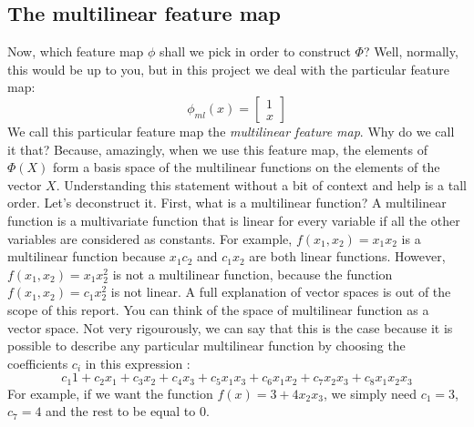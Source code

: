 \documentclass{article}
\theoremstyle{definition}
\theoremstyle{definition}
\begin{document}
\subsection{The multilinear feature map}
Now, which feature map $\phi$ shall we pick in order to construct $\Phi$?
Well, normally, this would be up to you, but in this project we deal with the particular feature map:
\begin{equation}
    \phi_{ml}(x) = 
    \begin{bmatrix}
        1 \\
        x
    \end{bmatrix}
\end{equation}
We call this particular feature map the \emph{multilinear feature map}.
Why do we call it that? Because, amazingly, when we use this feature map, the elements of $\Phi(X)$ form a basis space of the multilinear functions on the elements of the vector $X$.
Understanding this statement without a bit of context and help is a tall order. Let's deconstruct it.
First, what is a multilinear function? A multilinear function is a multivariate function that is linear for every variable if all the other variables are considered as constants. For example, $f(x_1, x_2) = x_1 x_2$ is a multilinear function because $x_1 c_2$ and $c_1 x_2$ are both linear functions. However, $f(x_1, x_2) = x_1 x_2^2$ is not a multilinear function, because the function $f(x_1, x_2) = c_1 x_2^2$ is not linear. A full explanation of vector spaces is out of the scope of this report. You can think of the space of multilinear function as a vector space. Not very rigourously, we can say that this is the case because it is possible to describe any particular multilinear function by choosing the coefficients $c_i$ in this expression :
\[
    c_1 1 + c_2 x_1 + c_3 x_2 + c_4 x_3  + c_5 x_1 x_3 + c_6 x_1 x_2 + c_7 x_2 x_3 + c_8 x_1 x_2 x_3
\]
For example, if we want the function $f(x) = 3 + 4 x_2 x_3$, we simply need $c_1 = 3$, $c_7 = 4$ and the rest to be equal to $0$.
\end{document}

